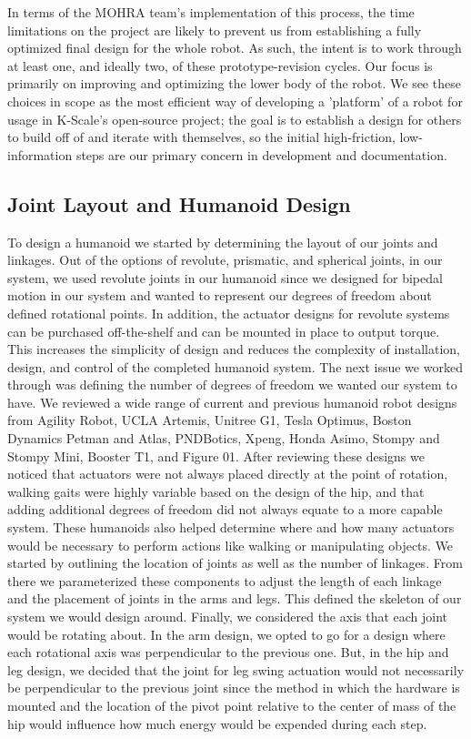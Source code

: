 \documentclass{article}
\begin{document}
In terms of the MOHRA team's implementation of this process, the time limitations on the project are likely to prevent us from establishing a fully optimized final design for the whole robot. As such, the intent is to work through at least one, and ideally two, of these prototype-revision cycles. Our focus is primarily on improving and optimizing the lower body of the robot. We see these choices in scope as the most efficient way of developing a 'platform' of a robot for usage in K-Scale's open-source project; the goal is to establish a design for others to build off of and iterate with themselves, so the initial high-friction, low-information steps are our primary concern in development and documentation.

\subsection{Joint Layout and Humanoid Design}
To design a humanoid we started by determining the layout of our joints and linkages. Out of the options of revolute, prismatic, and spherical joints, in our system, we used revolute joints in our humanoid since we designed for bipedal motion in our system and wanted to represent our degrees of freedom about defined rotational points. In addition, the actuator designs for revolute systems can be purchased off-the-shelf and can be mounted in place to output torque. This increases the simplicity of design and reduces the complexity of installation, design, and control of the completed humanoid system. The next issue we worked through was defining the number of degrees of freedom we wanted our system to have. We reviewed a wide range of current and previous humanoid robot designs from Agility Robot, UCLA Artemis, Unitree G1, Tesla Optimus, Boston Dynamics Petman and Atlas, PNDBotics, Xpeng, Honda Asimo, Stompy and Stompy Mini, Booster T1, and Figure 01. After reviewing these designs we noticed that actuators were not always placed directly at the point of rotation, walking gaits were highly variable based on the design of the hip, and that adding additional degrees of freedom did not always equate to a more capable system. These humanoids also helped determine where and how many actuators would be necessary to perform actions like walking or manipulating objects. We started by outlining the location of joints as well as the number of linkages. From there we parameterized these components to adjust the length of each linkage and the placement of joints in the arms and legs. This defined the skeleton of our system we would design around. Finally, we considered the axis that each joint would be rotating about. In the arm design, we opted to go for a design where each rotational axis was perpendicular to the previous one. But, in the hip and leg design, we decided that the joint for leg swing actuation would not necessarily be perpendicular to the previous joint since the method in which the hardware is mounted and the location of the pivot point relative to the center of mass of the hip would influence how much energy would be expended during each step. 
\end{document}
